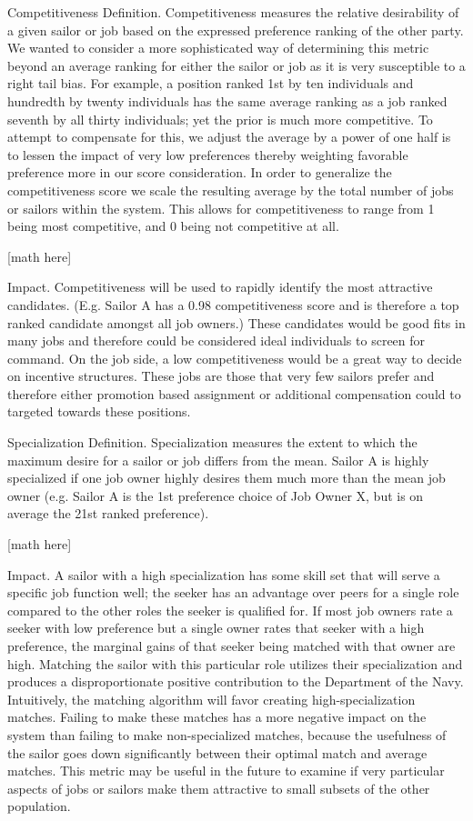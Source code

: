 Competitiveness
Definition.
Competitiveness measures the relative desirability of a given sailor or job based on the expressed preference ranking of the other party. We wanted to consider a more sophisticated way of determining this metric beyond an average ranking for either the sailor or job as it is very susceptible to a right tail bias.  For example, a position ranked 1st by ten individuals and hundredth by twenty individuals has the same average ranking as a job ranked seventh by all thirty individuals; yet the prior is much more competitive. To attempt to compensate for this, we adjust the average by a power of one half is to lessen the impact of very low preferences thereby weighting favorable preference more in our score consideration. 
 In order to generalize the competitiveness score we scale the resulting average by the total number of jobs or sailors within the system. This allows for competitiveness to range from 1 being most competitive, and 0 being not competitive at all.


[math here]


Impact.
Competitiveness will be used to rapidly identify the most attractive candidates. (E.g. Sailor A has a 0.98 competitiveness score and is therefore a top ranked candidate amongst all job owners.) These candidates would be good fits in many jobs and therefore could be considered ideal individuals to screen for command. On the job side, a low competitiveness would be a great way to decide on incentive structures. These jobs are those that very few sailors prefer and therefore either promotion based assignment or additional compensation could to targeted towards these positions. 

Specialization
Definition. 
Specialization measures the extent to which the maximum desire for a sailor or job differs from the mean. Sailor A is highly specialized if one job owner highly desires them much more than the mean job owner (e.g. Sailor A is the 1st preference choice of Job Owner X, but is on average the 21st ranked preference).

[math here]

Impact. 
A sailor with a high specialization has some skill set that will serve a specific job function well; the seeker has an advantage over peers for a single role compared to the other roles the seeker is qualified for. If most job owners rate a seeker with low preference but a single owner rates that seeker with a high preference, the marginal gains of that seeker being matched with that owner are high. Matching the sailor with this particular role utilizes their specialization and produces a disproportionate positive contribution to the Department of the Navy. Intuitively, the matching algorithm will favor creating high-specialization matches. Failing to make these matches has a more negative impact on the system than failing to make non-specialized matches, because the usefulness of the sailor goes down significantly between their optimal match and average matches. This metric may be useful in the future to examine if very particular aspects of jobs or sailors make them attractive to small subsets of the other population.


